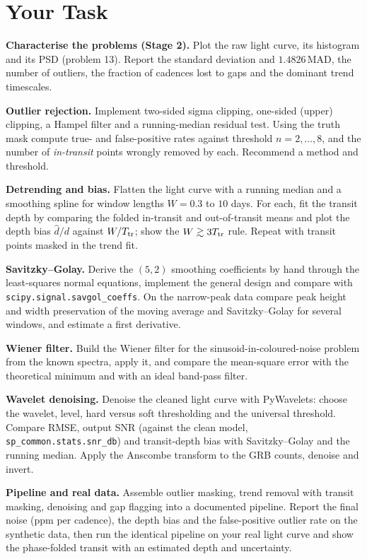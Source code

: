 \documentclass[11pt,a4paper]{article}
\begin{document}
\section*{Your Task}
\begin{tasks}
  \item \textbf{Characterise the problems (Stage 2).} Plot the raw light curve, its histogram and its PSD (problem 13). Report the standard deviation and $1.4826\,\mathrm{MAD}$, the number of outliers, the fraction of cadences lost to gaps and the dominant trend timescales.
  \item \textbf{Outlier rejection.} Implement two-sided sigma clipping, one-sided (upper) clipping, a Hampel filter and a running-median residual test. Using the truth mask compute true- and false-positive rates against threshold $n=2,\dots,8$, and the number of \emph{in-transit} points wrongly removed by each. Recommend a method and threshold.
  \item \textbf{Detrending and bias.} Flatten the light curve with a running median and a smoothing spline for window lengths $W=0.3$ to $10$ days. For each, fit the transit depth by comparing the folded in-transit and out-of-transit means and plot the depth bias $\hat d/d$ against $W/T_{\rm tr}$; show the $W\gtrsim3T_{\rm tr}$ rule. Repeat with transit points masked in the trend fit.
  \item \textbf{Savitzky--Golay.} Derive the $(5,2)$ smoothing coefficients by hand through the least-squares normal equations, implement the general design and compare with \texttt{scipy.signal.savgol\_coeffs}. On the narrow-peak data compare peak height and width preservation of the moving average and Savitzky--Golay for several windows, and estimate a first derivative.
  \item \textbf{Wiener filter.} Build the Wiener filter for the sinusoid-in-coloured-noise problem from the known spectra, apply it, and compare the mean-square error with the theoretical minimum and with an ideal band-pass filter.
  \item \textbf{Wavelet denoising.} Denoise the cleaned light curve with PyWavelets: choose the wavelet, level, hard versus soft thresholding and the universal threshold. Compare RMSE, output SNR (against the clean model, \texttt{sp\_common.stats.snr\_db}) and transit-depth bias with Savitzky--Golay and the running median. Apply the Anscombe transform to the GRB counts, denoise and invert.
  \item \textbf{Pipeline and real data.} Assemble outlier masking, trend removal with transit masking, denoising and gap flagging into a documented pipeline. Report the final noise (ppm per cadence), the depth bias and the false-positive outlier rate on the synthetic data, then run the identical pipeline on your real light curve and show the phase-folded transit with an estimated depth and uncertainty.
\end{tasks}
\end{document}

